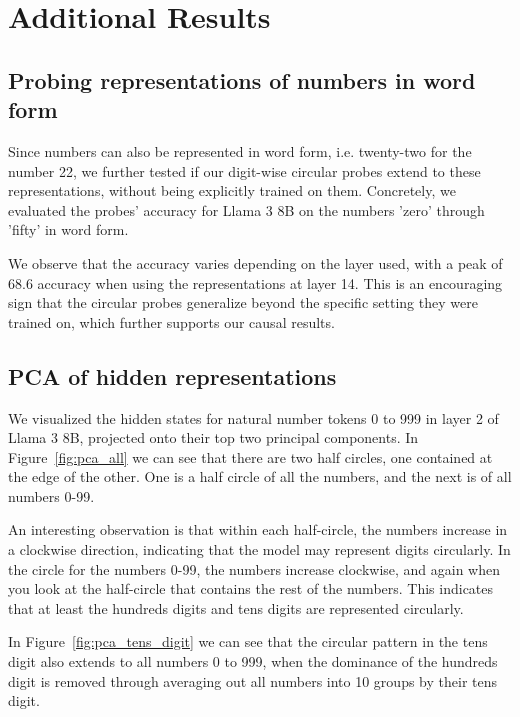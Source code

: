 \documentclass[11pt]{article}
\begin{document}
\appendix

\section{Additional Results}

\subsection{Probing representations of numbers in word form}
\label{apx:wordform}
Since numbers can also be represented in word form, i.e. twenty-two for the number 22, we further tested if our digit-wise circular probes extend to these representations, without being explicitly trained on them. Concretely, we evaluated the probes' accuracy for Llama 3 8B on the numbers 'zero' through 'fifty' in word form.

We observe that the accuracy varies depending on the layer used, with a peak of 68.6 accuracy when using the representations at layer 14.
This is an encouraging sign that the circular probes generalize beyond the specific setting they were trained on, which further supports our causal results.

\subsection{PCA of hidden representations}
\label{apx:pca}

We visualized the hidden states for natural number tokens 0 to 999 in layer 2 of Llama 3 8B, projected onto their top two principal components. In Figure~\ref{fig:pca_all} we can see that there are two half circles, one contained at the edge of the other. One is a half circle of all the numbers, and the next is of all numbers 0-99.

An interesting observation is that within each half-circle, the numbers increase in a clockwise direction, indicating that the model may represent digits circularly. In the circle for the numbers 0-99, the numbers increase clockwise, and again when you look at the half-circle that contains the rest of the numbers. This indicates that at least the hundreds digits and tens digits are represented circularly.

In Figure~\ref{fig:pca_tens_digit} we can see that the circular pattern in the tens digit also extends to all numbers 0 to 999, when the dominance of the hundreds digit is removed through averaging out all numbers into 10 groups by their tens digit.
\end{document}
